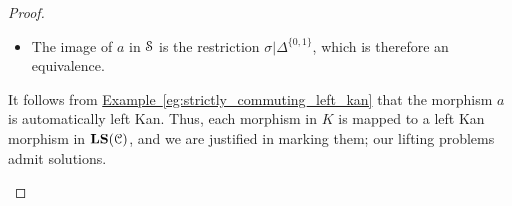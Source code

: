 \documentclass[main.tex]{subfiles}
\begin{document}
\begin{proof}
\begin{enumerate}
\begin{itemize}
        \item The image of $a$ in $\S$ is the restriction $\sigma|\Delta^{\{0,1\}}$, which is therefore an equivalence.
      \end{itemize}
      It follows from \hyperref[eg:strictly_commuting_left_kan]{Example~\ref*{eg:strictly_commuting_left_kan}} that the morphism $a$ is automatically left Kan. Thus, each morphism in $K$ is mapped to a left Kan morphism in $\LS(\category{C})$, and we are justified in marking them; our lifting problems admit solutions.
  \end{enumerate}
\end{proof}

%
%
%
\end{document}
